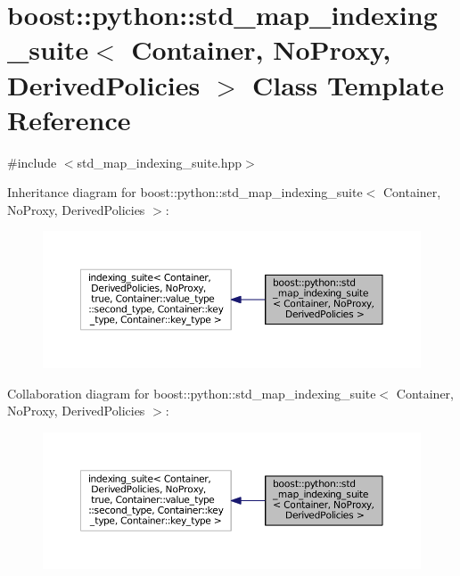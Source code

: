 \hypertarget{classboost_1_1python_1_1std__map__indexing__suite}{}\section{boost\+:\+:python\+:\+:std\+\_\+map\+\_\+indexing\+\_\+suite$<$ Container, No\+Proxy, Derived\+Policies $>$ Class Template Reference}
\label{classboost_1_1python_1_1std__map__indexing__suite}


{\ttfamily \#include $<$std\+\_\+map\+\_\+indexing\+\_\+suite.\+hpp$>$}



Inheritance diagram for boost\+:\+:python\+:\+:std\+\_\+map\+\_\+indexing\+\_\+suite$<$ Container, No\+Proxy, Derived\+Policies $>$\+:\nopagebreak
\begin{figure}[H]
\begin{center}
\leavevmode
\includegraphics[width=350pt]{classboost_1_1python_1_1std__map__indexing__suite__inherit__graph}
\end{center}
\end{figure}


Collaboration diagram for boost\+:\+:python\+:\+:std\+\_\+map\+\_\+indexing\+\_\+suite$<$ Container, No\+Proxy, Derived\+Policies $>$\+:\nopagebreak
\begin{figure}[H]
\begin{center}
\leavevmode
\includegraphics[width=350pt]{classboost_1_1python_1_1std__map__indexing__suite__coll__graph}
\end{center}
\end{figure}
